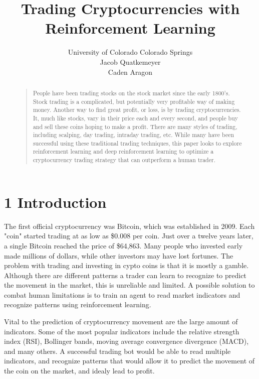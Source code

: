 \documentclass[letterpaper]{article}
\begin{document}
%
\title{Trading Cryptocurrencies with\\Reinforcement Learning}
\author{University of Colorado Colorado Springs\\Jacob Quatkemeyer\\Caden Aragon
}
\maketitle
\begin{abstract}
\begin{quote}
People have been trading stocks on the stock market since the early 1800's. Stock trading is a complicated, but potentially very profitable way of making money. Another way to find great
profit, or loss, is by trading cryptocurrencies. It, much like stocks, vary in their price each and every second, and people buy and sell these coins hoping to make a profit. There are many styles of trading, including scalping, day trading, intraday trading, etc. While many have been successful using these traditional trading techniques, this paper looks to explore reinforcement learning and deep reinforcement learning to optimize a cryptocurrency trading strategy that can outperform a human trader.
\end{quote}
\end{abstract}

\section{1 Introduction}
\noindent The first official cryptocurrency was Bitcoin, which was established in 2009. Each "coin" started trading at as low as \$0.008 per coin. Just over a twelve years later, a single Bitcoin reached the price of \$64,863. Many people who invested early made millions of dollars, while other investors may have lost fortunes. The problem with trading and investing in cypto coins is that it is mostly a gamble. Although there are different patterns a trader can learn to recognize to predict the movement in the market, this is unreliable and limited. A possible solution to combat human limitations is to train an agent to read market indicators and recognize patterns using reinforcement learning.

Vital to the prediction of cryptocurrency movement are the large amount of indicators. Some of the most popular indicators include the relative strength index (RSI), Bollinger bands, moving average convergence divergence (MACD), and many others. A successful trading bot would be able to read multiple indicators, and recognize patterns that would allow it to predict the movement of the coin on the market, and idealy lead to profit. 
\end{document}
